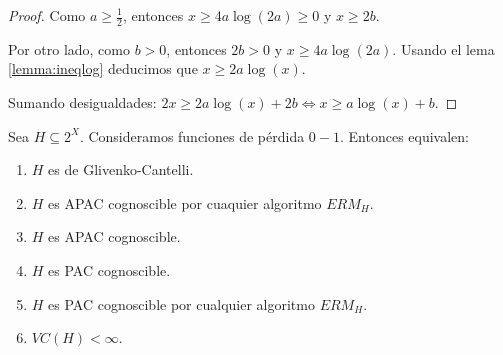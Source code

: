 \begin{proof}
 Como $a \ge \frac{1}{2}$, entonces $x \ge 4a \log(2a) \ge 0$ y $x \ge 2b$.
 
 Por otro lado, como $b > 0$, entonces $2b > 0$ y $x \ge 4a \log(2a)$. Usando el lema \ref{lemma:ineqlog} 
 deducimos que $x \ge 2a \log(x)$.
 
 Sumando desigualdades: $2x \ge 2a \log(x) + 2b \Leftrightarrow x \ge a\log(x) + b$.
\end{proof}


\begin{theorem}
Sea $H\subseteq 2^X$. Consideramos funciones de pérdida $0-1$. Entonces equivalen:
\begin{enumerate}[i]
\item \label{th:fundi} $H$ es de Glivenko-Cantelli.
\item \label{th:fundii} $H$ es APAC cognoscible por cuaquier algoritmo $ERM_H$.
\item \label{th:fundiii} $H$ es APAC cognoscible.
\item \label{th:fundiv} $H$ es PAC cognoscible.
\item \label{th:fundv} $H$ es PAC cognoscible por cualquier algoritmo $ERM_H$.
\item \label{th:fundvi} $VC (H) < \infty$.
\end{enumerate}
\label{th:fundamental}
\end{theorem}

